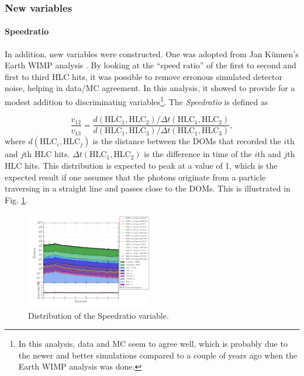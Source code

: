 \subsubsection{New variables}

\paragraph{Speedratio}
In addition, new variables were constructed. One was adopted from Jan K\"unnen's Earth WIMP analysis \cite{kunnenthesis}. By looking at the ``speed ratio'' of the first to second and first to third HLC hits, it was possible to remove erronous simulated detector noise, helping in data/MC agreement. In this analysis, it showed to provide for a modest addition to discriminating variables\footnote{In this analysis, data and MC seem to agree well, which is probably due to the newer and better simulations compared to a couple of years ago when the Earth WIMP analysis was done.}. The \textit{Speedratio} is defined as

\begin{equation}
\frac{v_{12}}{v_{13}} = \frac{d\left( \textrm{HLC}_1,\textrm{HLC}_2 \right)/\Delta t\left(\textrm{HLC}_1, \textrm{HLC}_2\right)}{d\left(\textrm{HLC}_1, \textrm{HLC}_3 \right)/\Delta t\left(\textrm{HLC}_1,\textrm{HLC}_3 \right)},
\end{equation}
where $d\left( \textrm{HLC}_i,\textrm{HLC}_j \right)$ is the distance between the DOMs that recorded the $i$th and $j$th HLC hits. $\Delta t\left(\textrm{HLC}_1, \textrm{HLC}_2\right)$ is the difference in time of the $i$th and $j$th HLC hits. This distribution is expected to peak at a value of 1, which is the expected result if one assumes that the photons originate from a particle traversing in a straight line and passes close to the DOMs. This is illustrated in Fig. \ref{fig:newvariables1}.

\begin{figure}
\centering
\includegraphics[width=0.49\textwidth]{chapter8/img/1D_stack_speedratio.png}
\caption{Distribution of the Speedratio variable.}
\label{fig:newvariables1}
\end{figure}


